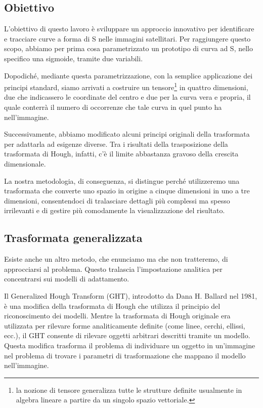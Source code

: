 \newpage

\newpage

\subsection{Obiettivo}
L'obiettivo di questo lavoro è sviluppare un approccio innovativo per identificare e tracciare curve a forma di S nelle immagini satellitari. Per raggiungere questo scopo, abbiamo per prima cosa parametrizzato un prototipo di curva ad S, nello specifico una sigmoide, tramite due variabili.\par
Dopodiché, mediante questa parametrizzazione, con la semplice applicazione dei principi standard, siamo arrivati a costruire un tensore\footnote{la nozione di tensore generalizza tutte le strutture definite usualmente in algebra lineare a partire da un singolo spazio vettoriale\cite{wiki:tensore}.} in quattro dimensioni, due che indicassero le coordinate del centro e due per la curva vera e propria, il quale conterrà il numero di occorrenze che tale curva in quel punto ha nell'immagine.\par
Successivamente, abbiamo modificato alcuni principi originali della trasformata per adattarla ad esigenze diverse. Tra i risultati della trasposizione della trasformata di Hough, infatti, c'è il limite abbastanza gravoso della crescita dimensionale.\par
La nostra metodologia, di conseguenza, si distingue perché utilizzeremo una trasformata che converte uno spazio in origine a cinque dimensioni in uno a tre dimensioni, consentendoci di tralasciare dettagli più complessi ma spesso irrilevanti e di gestire più comodamente la visualizzazione del risultato.\par

\subsection{Trasformata generalizzata}
Esiste anche un altro metodo, che enunciamo ma che non tratteremo, di approcciarsi al problema. Questo tralascia l'impostazione analitica per concentrarsi sui modelli di adattamento.\par
Il Generalized Hough Transform (GHT)\cite{ballard1981generalizing}, introdotto da Dana H. Ballard nel 1981, è una modifica della trasformata di Hough che utilizza il principio del riconoscimento dei modelli. Mentre la trasformata di Hough originale era utilizzata per rilevare forme analiticamente definite (come linee, cerchi, ellissi, ecc.), il GHT consente di rilevare oggetti arbitrari descritti tramite un modello. Questa modifica trasforma il problema di individuare un oggetto in un'immagine nel problema di trovare i parametri di trasformazione che mappano il modello nell'immagine.